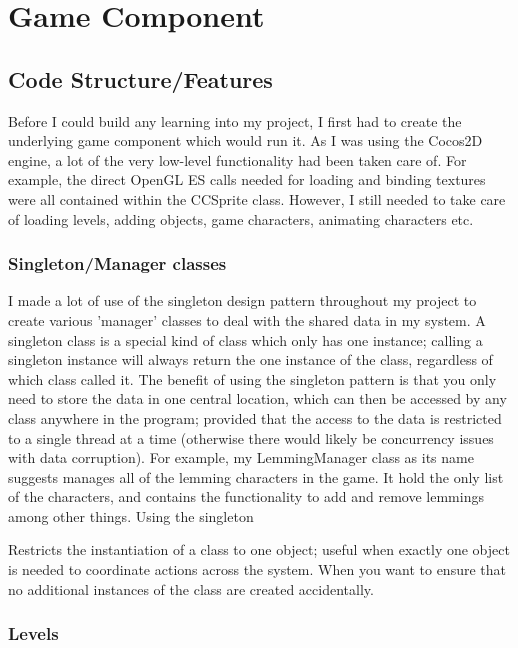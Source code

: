 \documentclass[a4paper,oneside]{report}
\begin{document}
\chapter{Game Component}
		
\section{Code Structure/Features}

Before I could build any learning into my project, I first had to create the underlying game component which would run it. As I was using the Cocos2D engine, a lot of the very low-level functionality had been taken care of. For example, the direct OpenGL ES calls needed for loading and binding textures were all contained within the CCSprite class. However, I still needed to take care of loading levels, adding objects, game characters, animating characters etc.

\subsection{Singleton/Manager classes} 

I made a lot of use of the singleton design pattern throughout my project to create various 'manager' classes to deal with the shared data in my system. A singleton class is a special kind of class which only has one instance; calling a singleton instance will always return the one instance of the class, regardless of which class called it. The benefit of using the singleton pattern is that you only need to store the data in one central location, which can then be accessed by any class anywhere in the program; provided that the access to the data is restricted to a single thread at a time (otherwise there would likely be concurrency issues with data corruption). For example, my LemmingManager class as its name suggests manages all of the lemming characters in the game. It hold the only list of the characters, and contains the functionality to add and remove lemmings among other things. Using the singleton 

Restricts the instantiation of a class to one object; useful when exactly one object is needed to coordinate actions across the system. When you want to ensure that no additional instances of the class are created accidentally.

\subsection{Levels} 
\end{document}
